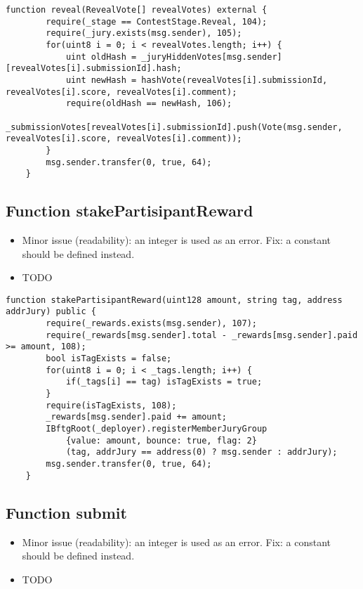 \begin{lstlisting}[firstnumber=155]
    function reveal(RevealVote[] revealVotes) external {
        require(_stage == ContestStage.Reveal, 104);
        require(_jury.exists(msg.sender), 105);
        for(uint8 i = 0; i < revealVotes.length; i++) {
            uint oldHash = _juryHiddenVotes[msg.sender][revealVotes[i].submissionId].hash;
            uint newHash = hashVote(revealVotes[i].submissionId, revealVotes[i].score, revealVotes[i].comment);
            require(oldHash == newHash, 106);
            _submissionVotes[revealVotes[i].submissionId].push(Vote(msg.sender, revealVotes[i].score, revealVotes[i].comment));
        }
        msg.sender.transfer(0, true, 64);
    }
\end{lstlisting}

\subsection{Function stakePartisipantReward}

\begin{itemize}
\item Minor issue (readability): an integer is used as an error. Fix:
  a constant should be defined instead.
\item TODO
\end{itemize}

\begin{lstlisting}[firstnumber=204]
    function stakePartisipantReward(uint128 amount, string tag, address addrJury) public {
        require(_rewards.exists(msg.sender), 107);
        require(_rewards[msg.sender].total - _rewards[msg.sender].paid >= amount, 108);
        bool isTagExists = false;
        for(uint8 i = 0; i < _tags.length; i++) {
            if(_tags[i] == tag) isTagExists = true;
        }
        require(isTagExists, 108);
        _rewards[msg.sender].paid += amount;
        IBftgRoot(_deployer).registerMemberJuryGroup
            {value: amount, bounce: true, flag: 2}
            (tag, addrJury == address(0) ? msg.sender : addrJury);
        msg.sender.transfer(0, true, 64);
    }
\end{lstlisting}

\subsection{Function submit}

\begin{itemize}
\item Minor issue (readability): an integer is used as an error. Fix:
  a constant should be defined instead.
\item TODO
\end{itemize}

